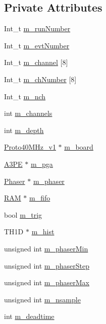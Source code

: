 \subsection*{Private Attributes}
\begin{DoxyCompactItemize}
\item 
Int\_\-t \hyperlink{classPhaserScan_a158add7f69adba5e4623afda6c9b31e2}{m\_\-runNumber}
\item 
Int\_\-t \hyperlink{classPhaserScan_a038d4303bd3f2446417ec2af5d9995cf}{m\_\-evtNumber}
\item 
Int\_\-t \hyperlink{classPhaserScan_a983fb003ef3c41d1dcf1078247548d82}{m\_\-channel} \mbox{[}8\mbox{]}
\item 
Int\_\-t \hyperlink{classPhaserScan_a6fd741cbc6a81d527e25aa9e8c7f27e0}{m\_\-chNumber} \mbox{[}8\mbox{]}
\item 
Int\_\-t \hyperlink{classPhaserScan_aa73583dea3f784eaacaffdd356e51e9d}{m\_\-nch}
\item 
int \hyperlink{classPhaserScan_a3e9894ae646ed25d26a07532c1a2b8b7}{m\_\-channels}
\item 
int \hyperlink{classPhaserScan_a445487a8eea9b6d484ae8615cb1bd52d}{m\_\-depth}
\item 
\hyperlink{classProto40MHz__v1}{Proto40MHz\_\-v1} $\ast$ \hyperlink{classPhaserScan_aec1f340810d0cf1f98155673385ffff5}{m\_\-board}
\item 
\hyperlink{classA3PE}{A3PE} $\ast$ \hyperlink{classPhaserScan_a2065860536763c7f9fd6b8b41908e673}{m\_\-pga}
\item 
\hyperlink{classPhaser}{Phaser} $\ast$ \hyperlink{classPhaserScan_ae2726b0d199ca8ae713cea55866d4ae3}{m\_\-phaser}
\item 
\hyperlink{classRAM}{RAM} $\ast$ \hyperlink{classPhaserScan_a4249cdec58c8163d9f3663be8e929cdf}{m\_\-fifo}
\item 
bool \hyperlink{classPhaserScan_ab3fd16cfcce13a09f5c1e91d96de60e6}{m\_\-trig}
\item 
TH1D $\ast$ \hyperlink{classPhaserScan_abd6954d739e7b2b0d36d09a080146d60}{m\_\-hist}
\item 
unsigned int \hyperlink{classPhaserScan_a65f83dd6b9e6c62cd828ef7b094c0361}{m\_\-phaserMin}
\item 
unsigned int \hyperlink{classPhaserScan_aed5bcb2582744f73a6189544c272213b}{m\_\-phaserStep}
\item 
unsigned int \hyperlink{classPhaserScan_ab47dd8cf441f9c713aa8c3e2251b382d}{m\_\-phaserMax}
\item 
unsigned int \hyperlink{classPhaserScan_a6c2089bb98fa8a897430b17ddb052447}{m\_\-nsample}
\item 
int \hyperlink{classPhaserScan_aef87ca678cea59093899a7cd138a9e25}{m\_\-deadtime}
\end{DoxyCompactItemize}
